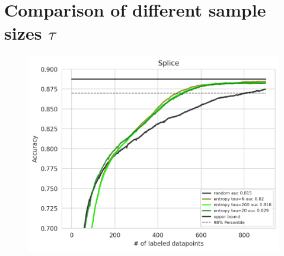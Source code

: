 \documentclass[]{article}
\begin{document}

 

\appendix

\section{Comparison of different sample sizes $\tau$}
\begin{figure}[H]
	\centering
	\includegraphics[width=0.7\linewidth]{img/tau_ablation.png}
\end{figure}
\end{document}
